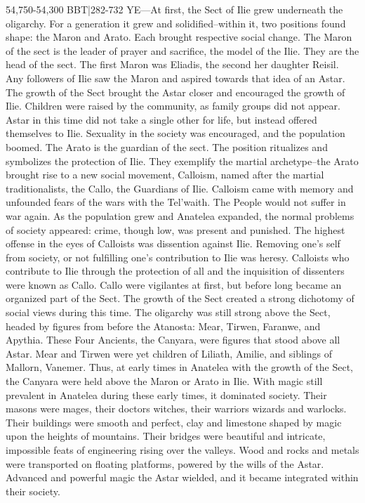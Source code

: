 \documentclass[smalldemyvopaper,11pt,twoside,onecolumn,openright,extrafontsizes]{memoir}
\begin{document}
{{54,750-54,300 BBT|282-732 YE—At first, the Sect of Ilie grew underneath the oligarchy. For a generation it grew and solidified--within it, two positions found shape: the Maron and Arato. Each brought respective social change. The Maron of the sect is the leader of prayer and sacrifice, the model of the Ilie. They are the head of the sect. The first Maron was Eliadis, the second her daughter Reisil. Any followers of Ilie saw the Maron and aspired towards that idea of an Astar. The growth of the Sect brought the Astar closer and encouraged the growth of Ilie. Children were raised by the community, as family groups did not appear. Astar in this time did not take a single other for life, but instead offered themselves to Ilie. Sexuality in the society was encouraged, and the population boomed.
	The Arato is the guardian of the sect. The position ritualizes and symbolizes the protection of Ilie. They exemplify the martial archetype--the Arato brought rise to a new social movement, Calloism, named after the martial traditionalists, the Callo, the Guardians of Ilie. Calloism came with memory and unfounded fears of the wars with the Tel'waith. The People would not suffer in war again. As the population grew and Anatelea expanded, the normal problems of society appeared: crime, though low, was present and punished. The highest offense in the eyes of Calloists was dissention against Ilie. Removing one’s self from society, or not fulfilling one’s contribution to Ilie was heresy. Calloists who contribute to Ilie through the protection of all and the inquisition of dissenters were known as Callo. Callo were vigilantes at first, but before long became an organized part of the Sect.
	The growth of the Sect created a strong dichotomy of social views during this time. The oligarchy was still strong above the Sect, headed by figures from before the Atanosta: Mear, Tirwen, Faranwe, and Apythia. These Four Ancients, the Canyara, were figures that stood above all Astar. Mear and Tirwen were yet children of Liliath, Amilie, and siblings of Mallorn, Vanemer. Thus, at early times in Anatelea with the growth of the Sect, the Canyara were held above the Maron or Arato in Ilie.
	With magic still prevalent in Anatelea during these early times, it dominated society. Their masons were mages, their doctors witches, their warriors wizards and warlocks. Their buildings were smooth and perfect, clay and limestone shaped by magic upon the heights of mountains. Their bridges were beautiful and intricate, impossible feats of engineering rising over the valleys. Wood and rocks and metals were transported on floating platforms, powered by the wills of the Astar. Advanced and powerful magic the Astar wielded, and it became integrated within their society.
}}
\end{document}
